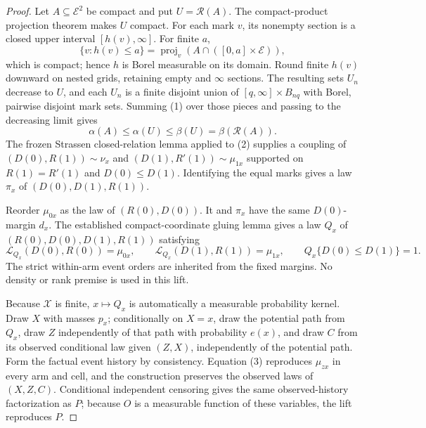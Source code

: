 \documentclass{article}
\begin{document}
\begin{proof}
Let \(A\subseteq\mathcal E^2\) be compact and put \(U=\mathcal R(A)\).  The compact-product projection theorem makes \(U\) compact.  For each mark \(v\), its nonempty section is a closed upper interval \([h(v),\infty]\).  For finite \(a\),
\[
\{v:h(v)\leq a\}
=\operatorname{proj}_v\!\left(A\cap([0,a]\times\mathcal E)\right),
\]
which is compact; hence \(h\) is Borel measurable on its domain.  Round finite \(h(v)\) downward on nested grids, retaining empty and \(\infty\) sections.  The resulting sets \(U_n\) decrease to \(U\), and each \(U_n\) is a finite disjoint union of \([q,\infty]\times B_{nq}\) with Borel, pairwise disjoint mark sets.  Summing (1) over those pieces and passing to the decreasing limit gives
\[
\alpha(A)\leq\alpha(U)\leq\beta(U)=\beta(\mathcal R(A)).             \tag{2}
\]
The frozen Strassen closed-relation lemma applied to (2) supplies a coupling of \((D(0),R(1))\sim\nu_x\) and \((D(1),R'(1))\sim\mu_{1x}\) supported on \(R(1)=R'(1)\) and \(D(0)\leq D(1)\).  Identifying the equal marks gives a law \(\pi_x\) of \((D(0),D(1),R(1))\).

Reorder \(\mu_{0x}\) as the law of \((R(0),D(0))\).  It and \(\pi_x\) have the same \(D(0)\)-margin \(d_x\).  The established compact-coordinate gluing lemma gives a law \(Q_x\) of \((R(0),D(0),D(1),R(1))\) satisfying
\[
\mathcal L_{Q_x}(D(0),R(0))=\mu_{0x},\qquad
\mathcal L_{Q_x}(D(1),R(1))=\mu_{1x},\qquad
Q_x\{D(0)\leq D(1)\}=1.                                            \tag{3}
\]
The strict within-arm event orders are inherited from the fixed margins.  No density or rank premise is used in this lift.

Because \(\mathcal X\) is finite, \(x\mapsto Q_x\) is automatically a measurable probability kernel.  Draw \(X\) with masses \(p_x\); conditionally on \(X=x\), draw the potential path from \(Q_x\), draw \(Z\) independently of that path with probability \(e(x)\), and draw \(C\) from its observed conditional law given \((Z,X)\), independently of the potential path.  Form the factual event history by consistency.  Equation (3) reproduces \(\mu_{zx}\) in every arm and cell, and the construction preserves the observed laws of \((X,Z,C)\).  Conditional independent censoring gives the same observed-history factorization as \(P\); because \(O\) is a measurable function of these variables, the lift reproduces \(P\).


\end{proof}
\end{document}

